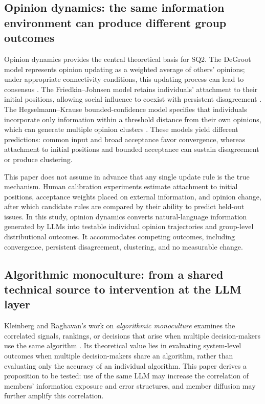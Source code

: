 \documentclass[11pt,a4paper]{article}
\newcommand{\term}[1]{\textit{#1}}
\begin{document}
\subsection{Opinion dynamics: the same information environment can produce different group outcomes}

Opinion dynamics provides the central theoretical basis for SQ2. The DeGroot model represents opinion updating as a weighted average of others' opinions; under appropriate connectivity conditions, this updating process can lead to consensus \cite{degroot1974}. The Friedkin--Johnsen model retains individuals' attachment to their initial positions, allowing social influence to coexist with persistent disagreement \cite{friedkin1990}. The Hegselmann--Krause bounded-confidence model specifies that individuals incorporate only information within a threshold distance from their own opinions, which can generate multiple opinion clusters \cite{hegselmann2002}. These models yield different predictions: common input and broad acceptance favor convergence, whereas attachment to initial positions and bounded acceptance can sustain disagreement or produce clustering.

This paper does not assume in advance that any single update rule is the true mechanism. Human calibration experiments estimate attachment to initial positions, acceptance weights placed on external information, and opinion change, after which candidate rules are compared by their ability to predict held-out issues. In this study, opinion dynamics converts natural-language information generated by LLMs into testable individual opinion trajectories and group-level distributional outcomes. It accommodates competing outcomes, including convergence, persistent disagreement, clustering, and no measurable change.

\subsection{Algorithmic monoculture: from a shared technical source to intervention at the LLM layer}

Kleinberg and Raghavan's work on \term{algorithmic monoculture} examines the correlated signals, rankings, or decisions that arise when multiple decision-makers use the same algorithm \cite{kleinberg2021}. Its theoretical value lies in evaluating system-level outcomes when multiple decision-makers share an algorithm, rather than evaluating only the accuracy of an individual algorithm. This paper derives a proposition to be tested: use of the same LLM may increase the correlation of members' information exposure and error structures, and member diffusion may further amplify this correlation.
\end{document}
